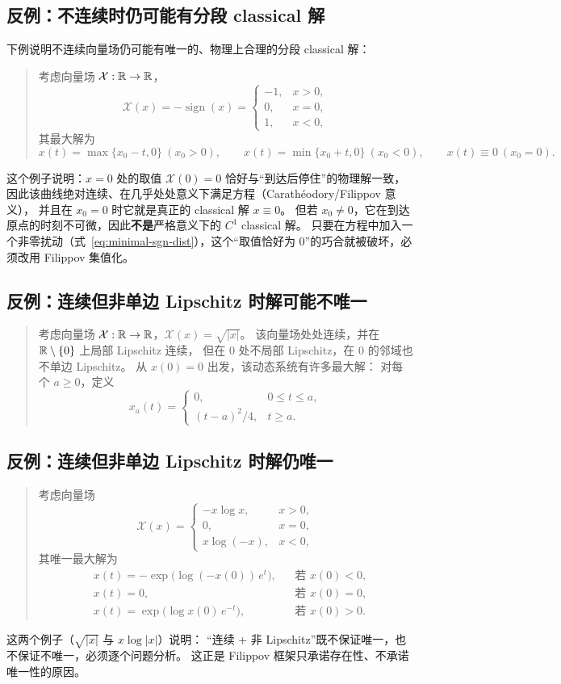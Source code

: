 \subsection{反例：不连续时仍可能有分段 classical 解}

下例说明不连续向量场仍可能有唯一的、物理上合理的分段 classical 解：
\begin{quote}
考虑向量场 $\mathcal{X}:\mathbb{R}\to\mathbb{R}$，
\[
\mathcal{X}(x)=-\operatorname{sign}(x)=\begin{cases}
-1, & x>0,\\
0,   & x=0,\\
1,   & x<0,
\end{cases}
\]
其最大解为
\[
x(t)=\max\{x_0-t,0\}\ (x_0>0),\qquad
x(t)=\min\{x_0+t,0\}\ (x_0<0),\qquad
x(t)\equiv0\ (x_0=0).
\]
\end{quote}
这个例子说明：$x=0$ 处的取值 $\mathcal{X}(0)=0$ 恰好与“到达后停住”的物理解一致，
因此该曲线绝对连续、在几乎处处意义下满足方程（Carathéodory/Filippov 意义），
并且在 $x_0=0$ 时它就是真正的 classical 解 $x\equiv0$。
但若 $x_0\ne0$，它在到达原点的时刻不可微，因此\textbf{不是}严格意义下的 $C^1$ classical 解。
只要在方程中加入一个非零扰动（式~\eqref{eq:minimal-sgn-dist}），这个“取值恰好为 0”的巧合就被破坏，必须改用 Filippov 集值化。

\subsection{反例：连续但非单边 Lipschitz 时解可能不唯一}

\begin{quote}
考虑向量场 $\mathcal{X}:\mathbb{R}\to\mathbb{R}$，$\mathcal{X}(x)=\sqrt{|x|}$。
该向量场处处连续，并在 $\mathbb{R}\setminus\{0\}$ 上局部 Lipschitz 连续，
但在 $0$ 处不局部 Lipschitz，在 $0$ 的邻域也不单边 Lipschitz。
从 $x(0)=0$ 出发，该动态系统有许多最大解：
对每个 $a\ge0$，定义
\[
x_a(t)=\begin{cases}
0, & 0\le t\le a,\\
(t-a)^2/4, & t\ge a .
\end{cases}
\]
\end{quote}

\subsection{反例：连续但非单边 Lipschitz 时解仍唯一}

\begin{quote}
考虑向量场
\[
\mathcal{X}(x)=\begin{cases}
-x\log x, & x>0,\\
0, & x=0,\\
x\log(-x), & x<0,
\end{cases}
\]
其唯一最大解为
\[
\begin{aligned}
&x(t)=-\exp\big(\log(-x(0))\,e^{t}\big), &&\text{若 } x(0)<0,\\
&x(t)=0, &&\text{若 } x(0)=0,\\
&x(t)=\exp\big(\log x(0)\,e^{-t}\big), &&\text{若 } x(0)>0 .
\end{aligned}
\]
\end{quote}
这两个例子（$\sqrt{|x|}$ 与 $x\log|x|$）说明：
“连续 + 非 Lipschitz”既不保证唯一，也不保证不唯一，必须逐个问题分析。
这正是 Filippov 框架只承诺存在性、不承诺唯一性的原因。

